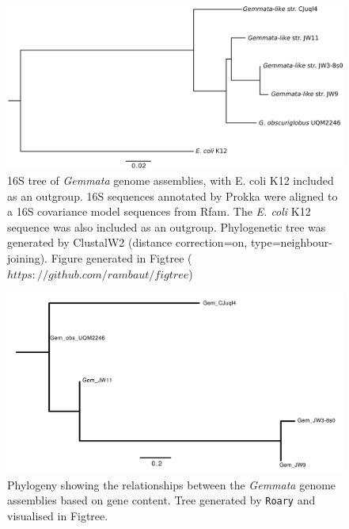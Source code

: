 \begin{figure}[H]
    \centering
    \includegraphics[scale=0.17]{assembly/gem_16S.png}
    \caption[16S tree of \textit{Gemmata} genome assemblies]{16S tree of \textit{Gemmata} genome assemblies, with E. coli K12 included as an outgroup. 16S sequences annotated by Prokka were aligned to a 16S covariance model sequences from Rfam. The \textit{E. coli} K12 sequence was also included as an outgroup. Phylogenetic tree was generated by ClustalW2 (distance correction=on, type=neighbour-joining). Figure generated in Figtree ($https://github.com/rambaut/figtree$)}
    \label{fig:my_label}
\end{figure}

\begin{figure}
    \centering
    \includegraphics[scale=0.3]{assembly/accessory_tree.png}
    \caption[Accessory gene tree for \textit{Gemmata} genome assemblies]{Phylogeny showing the relationships between the \textit{Gemmata} genome assemblies based on gene content. Tree generated by \texttt{Roary} \citep{Page2015-lu} and visualised in Figtree.}
    \label{fig:roary_tree}
\end{figure}

